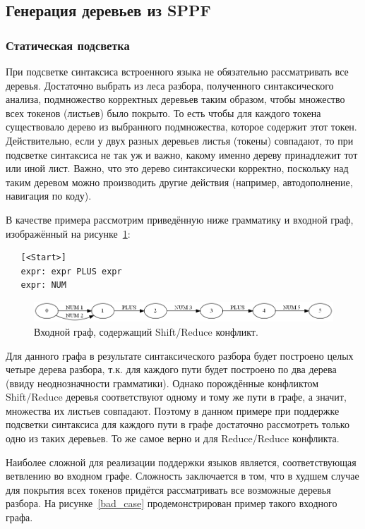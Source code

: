 \subsection{Генерация деревьев из SPPF}
\subsubsection{Статическая подсветка}
При подсветке синтаксиса встроенного языка не обязательно рассматривать все деревья. Достаточно выбрать из леса разбора, полученного синтаксического анализа, подмножество корректных деревьев таким образом, чтобы множество всех токенов (листьев) было покрыто. То есть чтобы для каждого токена существовало дерево из выбранного подмножества, которое содержит этот токен. Действительно, если у двух разных деревьев листья (токены) совпадают, то при подсветке синтаксиса не так уж и важно, какому именно дереву принадлежит тот или иной лист. Важно, что это дерево синтаксически корректно, поскольку над таким деревом можно производить другие действия (например, автодополнение, навигация по коду).

В качестве примера рассмотрим приведённую ниже грамматику и входной граф, изображённый на рисунке~\ref{shift_reduce_conflict}:

\begin{verbatim}
   [<Start>]
   expr: expr PLUS expr 
   expr: NUM
\end{verbatim}

\begin{figure}[t]
\centering
\includegraphics[width=\linewidth]{Ivanov/Pictures/Conflict.png}
\caption{Входной граф, содержащий Shift/Reduce конфликт.}
\label{shift_reduce_conflict}
\end{figure}

Для данного графа в результате синтаксического разбора будет построено целых четыре дерева разбора, т.к. для каждого пути будет построено по два дерева (ввиду неоднозначности грамматики). Однако порождённые конфликтом Shift/Reduce деревья соответствуют одному и тому же пути в графе, а значит, множества их листьев совпадают. Поэтому в данном примере при поддержке подсветки синтаксиса для каждого пути в графе достаточно рассмотреть только одно из таких деревьев. То же самое верно и для Reduce/Reduce конфликта. 

Наиболее сложной для реализации поддержки языков является, соответствующая ветвлению во входном графе. Сложность заключается в том, что в худшем случае для покрытия всех токенов придётся рассматривать все возможные деревья разбора. На рисунке~\ref{bad_case} продемонстрирован пример такого входного графа. 

